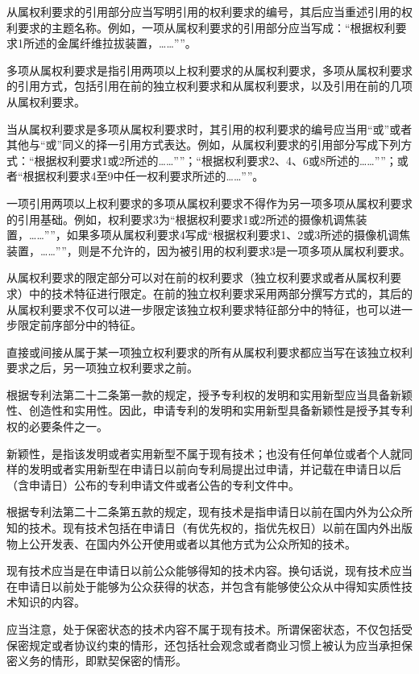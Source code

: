 从属权利要求的引用部分应当写明引用的权利要求的编号，其后应当重述引用的权利要求的主题名称。例如，一项从属权利要求的引用部分应当写成：“根据权利要求1所述的金属纤维拉拔装置，……””。

多项从属权利要求是指引用两项以上权利要求的从属权利要求，多项从属权利要求的引用方式，包括引用在前的独立权利要求和从属权利要求，以及引用在前的几项从属权利要求。

当从属权利要求是多项从属权利要求时，其引用的权利要求的编号应当用“或”或者其他与“或”同义的择一引用方式表达。例如，从属权利要求的引用部分写成下列方式：“根据权利要求1或2所述的……””；“根据权利要求2、4、6或8所述的……””；或者“根据权利要求4至9中任一权利要求所述的……””。

一项引用两项以上权利要求的多项从属权利要求不得作为另一项多项从属权利要求的引用基础。例如，权利要求3为“根据权利要求1或2所述的摄像机调焦装置，……””，如果多项从属权利要求4写成“根据权利要求1、2或3所述的摄像机调焦装置，……””，则是不允许的，因为被引用的权利要求3是一项多项从属权利要求。

从属权利要求的限定部分可以对在前的权利要求（独立权利要求或者从属权利要求）中的技术特征进行限定。在前的独立权利要求采用两部分撰写方式的，其后的从属权利要求不仅可以进一步限定该独立权利要求特征部分中的特征，也可以进一步限定前序部分中的特征。

直接或间接从属于某一项独立权利要求的所有从属权利要求都应当写在该独立权利要求之后，另一项独立权利要求之前。

根据专利法第二十二条第一款的规定，授予专利权的发明和实用新型应当具备新颖性、创造性和实用性。因此，申请专利的发明和实用新型具备新颖性是授予其专利权的必要条件之一。

新颖性，是指该发明或者实用新型不属于现有技术；也没有任何单位或者个人就同样的发明或者实用新型在申请日以前向专利局提出过申请，并记载在申请日以后（含申请日）公布的专利申请文件或者公告的专利文件中。

根据专利法第二十二条第五款的规定，现有技术是指申请日以前在国内外为公众所知的技术。现有技术包括在申请日（有优先权的，指优先权日）以前在国内外出版物上公开发表、在国内外公开使用或者以其他方式为公众所知的技术。

现有技术应当是在申请日以前公众能够得知的技术内容。换句话说，现有技术应当在申请日以前处于能够为公众获得的状态，并包含有能够使公众从中得知实质性技术知识的内容。

应当注意，处于保密状态的技术内容不属于现有技术。所谓保密状态，不仅包括受保密规定或者协议约束的情形，还包括社会观念或者商业习惯上被认为应当承担保密义务的情形，即默契保密的情形。

